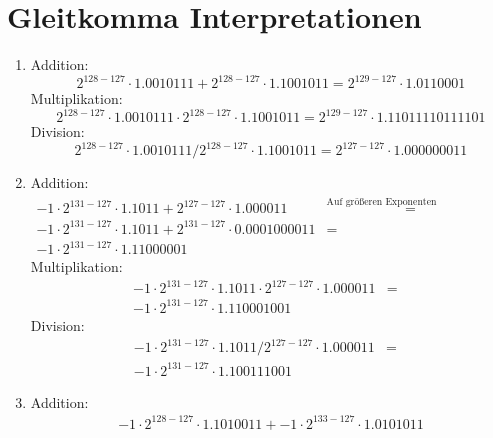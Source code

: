 \documentclass[DIN, pagenumber=false, fontsize=11pt, parskip=half]{scrartcl}
\begin{document}
    \section{Gleitkomma Interpretationen}
    \begin{enumerate}[label=(\alph*)]
        \item Addition:
            \begin{equation*}
                2^{128-127} \cdot 1.0010111 + 2^{128-127} \cdot 1.1001011 = 2^{129-127} \cdot 1.0110001
            \end{equation*}
            Multiplikation:
            \begin{equation*}
                2^{128-127} \cdot 1.0010111 \cdot 2^{128-127} \cdot 1.1001011 = 2^{129 - 127} \cdot 1.11011110111101
            \end{equation*}
            Division:
            \begin{equation*}
                2^{128-127} \cdot 1.0010111 / 2^{128-127} \cdot 1.1001011 = 2^{127 - 127} \cdot 1.000000011
            \end{equation*}
        \item Addition:
            \begin{eqnarray*}
                -1 \cdot 2^{131-127} \cdot 1.1011 + 2^{127-127} \cdot 1.000011 
                &\stackrel{\text{Auf größeren Exponenten normalisieren}}{=}&\\
                -1 \cdot 2^{131-127} \cdot 1.1011 + 2^{131-127} \cdot 0.0001000011 &=&\\
                -1 \cdot 2^{131-127} \cdot 1.11000001
            \end{eqnarray*}
            Multiplikation:
            \begin{eqnarray*}
                -1 \cdot 2^{131-127} \cdot 1.1011 \cdot 2^{127-127} \cdot 1.000011 &=&\\                 
                -1 \cdot 2^{131-127} \cdot 1.110001001
            \end{eqnarray*}
            Division:
            \begin{eqnarray*}
                -1 \cdot 2^{131-127} \cdot 1.1011 / 2^{127-127} \cdot 1.000011 &=&\\                 
                -1 \cdot 2^{131-127} \cdot 1.100111001
            \end{eqnarray*}
        \item Addition:
            \begin{eqnarray*}
                -1 \cdot 2^{128-127} \cdot 1.1010011 + -1 \cdot 2^{133-127} \cdot 1.0101011

\end{eqnarray*}
\end{enumerate}
\end{document}
